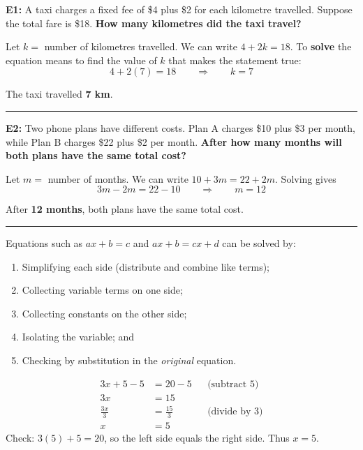 	\begin{multicols}{2}
		
		
		\textbf{E1:} A taxi charges a fixed fee of \$4 plus \$2 for each kilometre travelled.
		Suppose the total fare is \$18. \textbf{How many kilometres did the taxi travel?}
		
		Let $k =$ number of kilometres travelled. We can write $4+2k=18$.
		To \textbf{solve} the equation means to find the value of $k$ that makes the
		statement true: 
		\vspace{-2mm}
		\[
		4+2(7)=18 \qquad\Rightarrow\qquad k=7
		\] 
		
		\vspace{-2mm}
		The taxi travelled \textbf{7 km}.
		\vspace{-4mm}
		
		\noindent\rule{\linewidth}{0.4pt}
		
		\smallskip
		
		\textbf{E2:} Two phone plans have different costs. Plan A charges \$10 plus \$3 per month,
		while Plan B charges \$22 plus \$2 per month. \textbf{After how many months will
		both plans have the same total cost?}
		
		Let $m =$ number of months. We can write $10+3m=22+2m$. Solving gives \vspace{-2mm}
		\[
		3m-2m=22-10 \qquad\Rightarrow\qquad m=12
		\]
		
		\vspace{-3mm}
		After \textbf{12 months}, both plans have the same total cost.
		\vspace{-4mm}
		
		\noindent\rule{\linewidth}{0.4pt}
		
		Equations such as $ax+b=c$ and $ax+b=cx+d$ can be solved by:
		\begin{enumerate}
			\item Simplifying each side (distribute and combine like terms);
			\item Collecting variable terms on one side;
			\item Collecting constants on the other side;
			\item Isolating the variable; and
			\item Checking by substitution in the \emph{original} equation.
		\end{enumerate}
		
		\begin{align*}
			3x+5-5&=20-5 &&\text{(subtract 5)}\\
			3x&=15\\
			\frac{3x}{3}&=\frac{15}{3} &&\text{(divide by 3)}\\
			x&=5
		\end{align*}
		Check: $3(5)+5=20$, so the left side equals the right side. Thus $x=5$.
		

\end{multicols}
